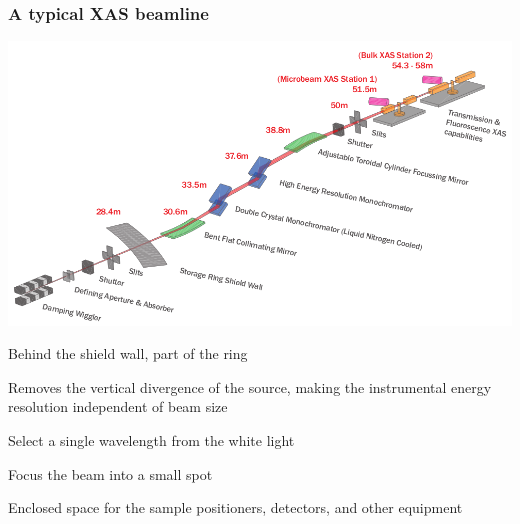 \documentclass[10pt, xcolor=x11names, compress]{beamer}
\begin{document}
\begin{frame}
  \frametitle{A typical XAS beamline}
  
  \small
  \begin{center}
    \includegraphics[width=0.7\linewidth]{bl/xas_beamline.png}
  \end{center} 
  \begin{description}
  \item[Source] Behind the shield wall, part of the ring
  \item[Collimating mirror] Removes the vertical divergence of the
    source, making the instrumental energy resolution independent of
    beam size
  \item[Monochromator] Select a single wavelength from the white light
  \item[Focusing mirror] Focus the beam into a small spot
  \item[Endstation] Enclosed space for the sample positioners,
    detectors, and other equipment
  \end{description}
\end{frame}
\end{document}
